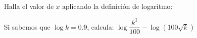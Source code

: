 \documentclass{exam}
\begin{document}
\begin{questions}
\begin{parts}
\end{parts}

\question Halla el valor de $x$ aplicando la definición de logaritmo: 

\question Si sabemos que $\log k =0.9$, calcula: $\log \dfrac{k^3}{100}-\log\left( 100 \sqrt{k}\right)$







\end{questions}
\end{document}
